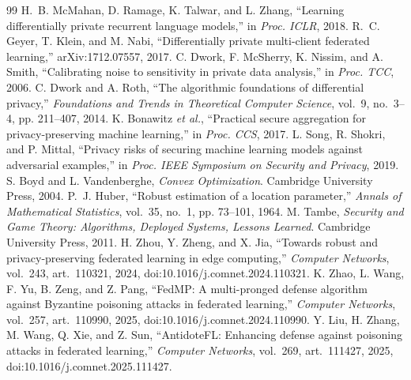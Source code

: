 \documentclass[final,1p,times]{elsarticle}
\newcommand{\etal}{\emph{et al.}}
\begin{document}
\begin{thebibliography}{99}
H.~B. McMahan, D. Ramage, K. Talwar, and L. Zhang, ``Learning
differentially private recurrent language models,'' in \emph{Proc.
ICLR}, 2018.
R.~C. Geyer, T. Klein, and M. Nabi, ``Differentially private
multi-client federated learning,'' arXiv:1712.07557, 2017.
C. Dwork, F. McSherry, K. Nissim, and A. Smith, ``Calibrating noise to
sensitivity in private data analysis,'' in \emph{Proc. TCC}, 2006.
C. Dwork and A. Roth, ``The algorithmic foundations of differential
privacy,'' \emph{Foundations and Trends in Theoretical Computer
Science}, vol.~9, no.~3--4, pp. 211--407, 2014.
K. Bonawitz \etal, ``Practical secure aggregation for privacy-preserving
machine learning,'' in \emph{Proc. CCS}, 2017.
L. Song, R. Shokri, and P. Mittal, ``Privacy risks of securing machine
learning models against adversarial examples,'' in \emph{Proc. IEEE
Symposium on Security and Privacy}, 2019.
S. Boyd and L. Vandenberghe, \emph{Convex Optimization}. Cambridge
University Press, 2004.
P.~J. Huber, ``Robust estimation of a location parameter,'' \emph{Annals
of Mathematical Statistics}, vol.~35, no.~1, pp. 73--101, 1964.
M. Tambe, \emph{Security and Game Theory: Algorithms, Deployed Systems,
Lessons Learned}. Cambridge University Press, 2011.
H. Zhou, Y. Zheng, and X. Jia, ``Towards robust and privacy-preserving
federated learning in edge computing,'' \emph{Computer Networks},
vol.~243, art.~110321, 2024, doi:10.1016/j.comnet.2024.110321.
K. Zhao, L. Wang, F. Yu, B. Zeng, and Z. Pang, ``FedMP: A multi-pronged
defense algorithm against Byzantine poisoning attacks in federated
learning,'' \emph{Computer Networks}, vol.~257, art.~110990, 2025,
doi:10.1016/j.comnet.2024.110990.
Y. Liu, H. Zhang, M. Wang, Q. Xie, and Z. Sun, ``AntidoteFL: Enhancing
defense against poisoning attacks in federated learning,'' \emph{Computer
Networks}, vol.~269, art.~111427, 2025, doi:10.1016/j.comnet.2025.111427.
\end{thebibliography}
\end{document}
